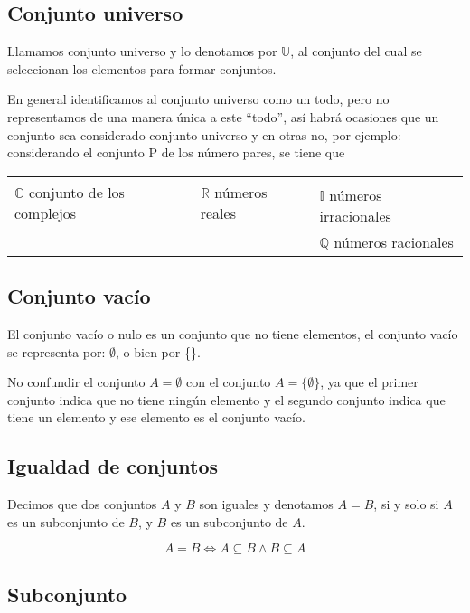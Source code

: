\subsection{Conjunto universo}
Llamamos conjunto universo y lo denotamos por $\mathbb U$, al conjunto del cual se
seleccionan los elementos para formar conjuntos.

En general identificamos al conjunto universo como un todo, pero no
representamos de una manera única a este “todo”, así habrá ocasiones que un
conjunto sea considerado conjunto universo y en otras no, por ejemplo:
considerando el conjunto P de los número pares, se tiene que

\begin{tabular}{ |l|l|l| }
    
\multirow{2}{4em}{$\mathbb C$ conjunto de los complejos} & \multirow{2}{4em}{$\mathbb R$ números reales} \\
    & & $\mathbb I$ números irracionales \\
    & & $\mathbb Q$ números racionales
\end{tabular}



\subsection{Conjunto vacío}

El conjunto vacío o nulo es un conjunto que no tiene elementos, el conjunto
vacío se representa por: $\emptyset$, o bien por \{\}.

No confundir el conjunto $A = \emptyset $ con el conjunto $ A = \{\emptyset\} $,
ya que el primer conjunto indica que no tiene ningún elemento y el segundo
conjunto indica que tiene un elemento y ese elemento es el conjunto vacío.

\subsection{Igualdad de conjuntos}

Decimos que dos conjuntos $A$ y $B$ son iguales y denotamos $A=B$, si y solo si
$A$ es un subconjunto de $B$, y $B$ es un subconjunto de $A$.

\begin{equation}
    A=B \iff A \subseteq B \land B \subseteq A
\end{equation}

\subsection{Subconjunto}

